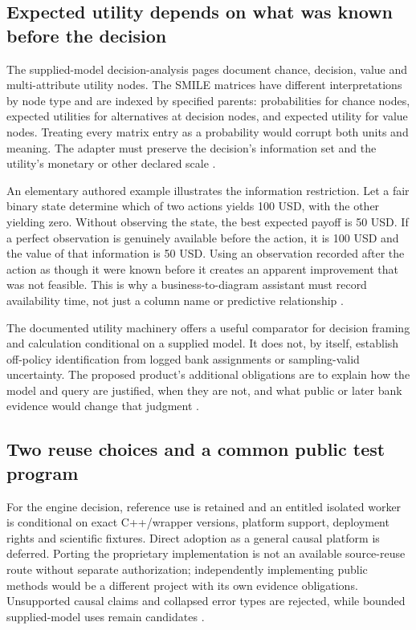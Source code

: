 \subsection{Expected utility depends on what was known before the decision}
The supplied-model decision-analysis pages document chance, decision,
value and multi-attribute utility nodes. The SMILE matrices have different
interpretations by node type and are indexed by specified parents:
probabilities for chance nodes, expected utilities for alternatives at
decision nodes, and expected utility for value nodes. Treating every matrix
entry as a probability would corrupt both units and meaning. The adapter
must preserve the decision's information set and the utility's monetary
or other declared scale \cite{exec16_cp_bayesfusion}.

An elementary authored example illustrates the information restriction.
Let a fair binary state determine which of two actions yields 100 USD,
with the other yielding zero. Without observing the state, the best
expected payoff is 50 USD. If a perfect observation is genuinely available
before the action, it is 100 USD and the value of that information is
50 USD. Using an observation recorded after the action as though it were
known before it creates an apparent improvement that was not feasible.
This is why a business-to-diagram assistant must record availability time,
not just a column name or predictive relationship
\cite{exec24_smile_choice}.

The documented utility machinery offers a useful comparator for decision
framing and calculation conditional on a supplied model. It does not, by
itself, establish off-policy identification from logged bank assignments or
sampling-valid uncertainty. The proposed product's additional obligations
are to explain how the model and query are justified, when they are not,
and what public or later bank evidence would change that judgment
\cite{exec16_cp_bayesfusion,exec24_smile_choice}.

\subsection{Two reuse choices and a common public test program}
For the engine decision, reference use is retained and an entitled isolated
worker is conditional on exact C++/wrapper versions, platform support,
deployment rights and scientific fixtures. Direct adoption as a general
causal platform is deferred. Porting the proprietary implementation is not
an available source-reuse route without separate authorization; independently
implementing public methods would be a different project with its own
evidence obligations. Unsupported causal claims and collapsed error types
are rejected, while bounded supplied-model uses remain candidates
\cite{exec13_smile_intro,exec13_smile_license,exec24_smile_choice}.

